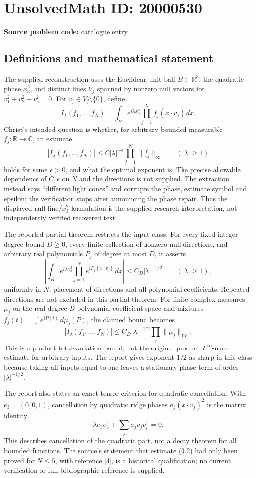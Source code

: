 \documentclass[11pt]{article}
\newcommand{\R}{\mathbb{R}}
\newcommand{\C}{\mathbb{C}}
\begin{document}
\section*{UnsolvedMath ID: 20000530}
\textbf{Source problem code:} catalogue entry
\subsection{Definitions and mathematical statement}
The supplied reconstruction uses the Euclidean unit ball \(B\subset\R^3\), the quadratic phase \(x_3^2\), and distinct lines \(V_j\) spanned by nonzero null vectors for
\(v_1^2+v_2^2-v_3^2=0\). For \(v_j\in V_j\setminus\{0\}\), define
\[
 I_\lambda(f_1,\ldots,f_N)=\int_B e^{i\lambda x_3^2}
 \prod_{j=1}^N f_j(x\cdot v_j)\,dx.
\]
Christ's intended question is whether, for arbitrary bounded measurable \(f_j:\R\to\C\), an estimate
\[
 |I_\lambda(f_1,\ldots,f_N)|\le C|\lambda|^{-\epsilon}
 \prod_{j=1}^N\|f_j\|_\infty\qquad(|\lambda|\ge1)
\]
holds for some \(\epsilon>0\), and what the optimal exponent is. The precise allowable dependence of \(C,\epsilon\) on \(N\) and the directions is not supplied. The extraction instead says ``different light cones'' and corrupts the phase, estimate symbol and epsilon; the verification stops after announcing the phase repair. Thus the displayed null-line/\(x_3^2\) formulation is the supplied research interpretation, not independently verified recovered text.

The reported partial theorem restricts the input class. For every fixed integer degree bound \(D\ge0\), every finite collection of nonzero null directions, and arbitrary real polynomials \(P_j\) of degree at most \(D\), it asserts
\[
 \left|\int_B e^{i\lambda x_3^2}\prod_{j=1}^N e^{iP_j(x\cdot v_j)}\,dx\right|
 \le C_D|\lambda|^{-1/2}\qquad(|\lambda|\ge1),
\]
uniformly in \(N\), placement of directions and all polynomial coefficients. Repeated directions are not excluded in this partial theorem. For finite complex measures \(\mu_j\) on the real degree-\(D\) polynomial coefficient space and mixtures
\(f_j(t)=\int e^{iP(t)}\,d\mu_j(P)\), the claimed bound becomes
\[
 |I_\lambda(f_1,\ldots,f_N)|\le C_D|\lambda|^{-1/2}
 \prod_j\|\mu_j\|_{\mathrm{TV}}.
\]
This is a product total-variation bound, not the original product \(L^\infty\)-norm estimate for arbitrary inputs. The report gives exponent \(1/2\) as sharp in this class because taking all inputs equal to one leaves a stationary-phase term of order \(|\lambda|^{-1/2}\).

The report also states an exact tensor criterion for quadratic cancellation. With \(e_3=(0,0,1)\), cancellation by quadratic ridge phases \(a_j(x\cdot v_j)^2\) is the matrix identity
\[
 \lambda e_3e_3^{\mathsf T}+\sum_j a_jv_jv_j^{\mathsf T}=0.
\]
This describes cancellation of the quadratic part, not a decay theorem for all bounded functions. The source's statement that estimate (0.2) had only been proved for \(N\le5\), with reference [4], is a historical qualification; no current verification or full bibliographic reference is supplied.
\end{document}
